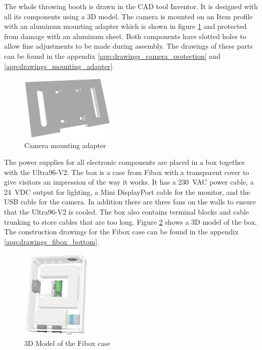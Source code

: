 The whole throwing booth is drawn in the CAD tool Inventor. It is designed with all its components using a 3D model.
The camera is mounted on an Item profile with an aluminum mounting adapter which is shown in figure \ref{fig:mounting_adapter} and protected from damage with an aluminum sheet.
Both components have slotted holes to allow fine adjustments to be made during assembly.
The drawings of these parts can be found in the appendix \ref{app:drawings_camera_protection} and \ref{app:drawings_mounting_adapter}.

\begin{figure}[h]
	\centering
	\includegraphics[width=0.4\textwidth]{graphics/mounting_adapter.png}
	\caption{Camera mounting adapter}
	\label{fig:mounting_adapter}
\end{figure}

The power supplies for all electronic components are placed in a box together with the Ultra96-V2.
The box is a case from Fibox with a transparent cover to give visitors an impression of the way it works.
It has a \SI{230}{VAC} power cable, a \SI{24}{VDC} output for lighting, a Mini DisplayPort cable for the monitor, and the USB cable for the camera.
In addition there are three fans on the walls to ensure that the Ultra96-V2 is cooled.
The box also contains terminal blocks and cable trunking to store cables that are too long.
Figure \ref{fig:fibox3d} shows a 3D model of the box. The construction drawings for the Fibox case can be found in the appendix \ref{app:drawings_fibox_bottom}.

\begin{figure}[h]
	\centering
	\includegraphics[width=0.3\textwidth]{graphics/case.png}
	\caption{3D Model of the Fibox case}
	\label{fig:fibox3d}
\end{figure}